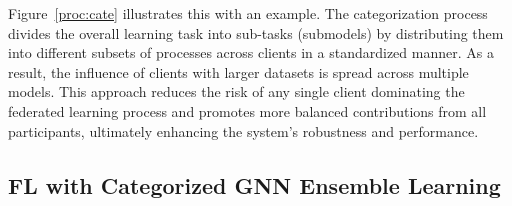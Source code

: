 Figure~\ref{proc:cate} illustrates this with an example. The categorization process divides the overall learning task into sub-tasks (submodels) by distributing them into different subsets of processes across clients in a standardized manner. As a result, the influence of clients with larger datasets is spread across multiple models. This approach reduces the risk of any single client dominating the federated learning process and promotes more balanced contributions from all participants, ultimately enhancing the system's robustness and performance.


%

\subsection{FL with Categorized GNN Ensemble Learning}
\label{sys:fpgl}



